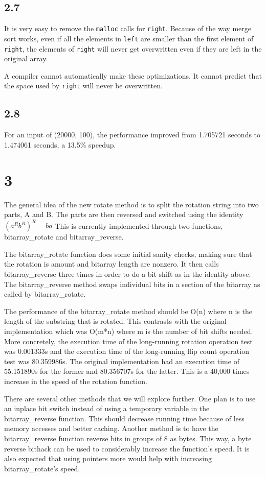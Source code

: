 \documentclass[12pt]{article}
\begin{document}
\subsection{2.7}
It is very easy to remove the {\tt malloc} calls for {\tt right}. Because of the way merge sort works, even if
all the elements in {\tt left} are smaller than the first element of {\tt right}, the elements of {\tt right}
will never get overwritten even if they are left in the original array.

A compiler cannot automatically make these optimizations. It cannot predict that the space used by {\tt right}
will never be overwritten.

\subsection{2.8}
For an input of (20000, 100), the performance improved from 1.705721 seconds to 1.474061 seconds, a 13.5\%
speedup.

\section{3}
The general idea of the new rotate method is to split the rotation string into 
two parts, A and B.  The parts are then reversed and switched using the identity 
$(a^R b^R)^R = ba$  This is currently implemented through two functions, 
bitarray_rotate and bitarray_reverse.  

The bitarray_rotate function does some initial sanity checks, making sure that 
the rotation is amount and bitarray length are nonzero.  It then calls 
bitarray_reverse three times in order to do a bit shift as in the identity 
above.  The bitarray_reverse method swaps individual bits in a section of the 
bitarray as called by bitarray_rotate.  

The performance of the bitarray_rotate method should be O(n) where n is the 
length of the substring that is rotated.  This contrasts with the original 
implementation which was O(m*n) where m is the number of bit shifts needed.  
More concretely, the execution time of the long-running rotation operation test 
was 0.001333s and the execution time of the long-running flip count operation 
test was 80.359986s.  The original implementation had an execution time of 
55.151890s for the former and 80.356707s for the latter.  This is a 40,000 times 
increase in the speed of the rotation function.  

There are several other methods that we will explore further.  One plan is to 
use an inplace bit switch instead of using a temporary variable in the 
bitarray_reverse function.  This should decrease running time because of less 
memory accesses and better caching.  Another method is to have the 
bitarray_reverse function reverse bits in groups of 8 as bytes.  This way, a 
byte reverse bithack can be used to considerably increase the function's speed.  
It is also expected that using pointers more would help with increasing 
bitarray_rotate's speed.  
\end{document}
